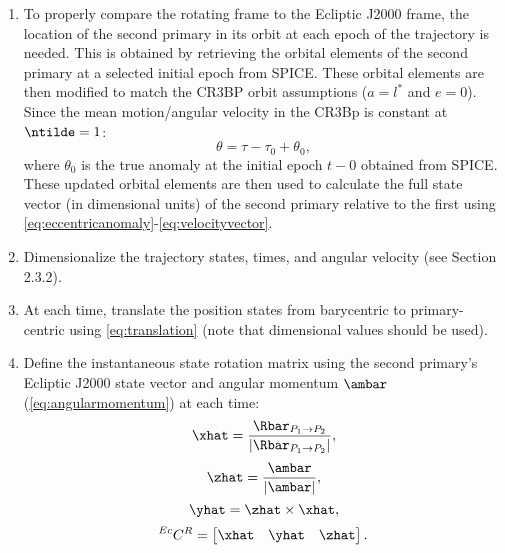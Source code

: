 \begin{enumerate}
    \item   To properly compare the rotating frame to the Ecliptic J2000 frame, the location of the
            second primary in its orbit at each epoch of the trajectory is needed. This is obtained
            by retrieving the orbital elements of the second primary at a selected initial epoch
            from SPICE\cite{Semenov:2023}. These orbital elements are then modified to match the
            CR3BP orbit assumptions ($a=l^{*}$ and $e=0$). Since the mean motion/angular velocity
            in the CR3Bp is constant at $\ntilde=1$:
            \begin{equation}
                \theta=\tau-\tau_{0}+\theta_{0},
                \label{eq:instantaneoustrueanomaly}
            \end{equation}
            where $\theta_{0}$ is the true anomaly at the initial epoch $t-{0}$ obtained from
            SPICE. These updated orbital elements are then used to calculate the full state vector
            (in dimensional units) of the second primary relative to the first using
            \cref{eq:eccentricanomaly}-\cref{eq:velocityvector}.
    \item   Dimensionalize the trajectory states, times, and angular velocity (see Section 2.3.2).
    \item   At each time, translate the position states from barycentric to primary-centric using
            \cref{eq:translation} (note that dimensional values should be used).
    \item   Define the instantaneous state rotation matrix using the second primary's Ecliptic
            J2000 state vector and angular momentum $\ambar$ (\cref{eq:angularmomentum}) at each
            time:
            \begin{equation}
                \xhat=\frac{\Rbar_{P_{1}\rightarrow P_{2}}}{|\Rbar_{P_{1}\rightarrow P_{2}}|},
                \label{eq:xhat}
            \end{equation}
            \begin{equation}
                \zhat=\frac{\ambar}{|\ambar|},
                \label{eq:zhat}
            \end{equation}
            \begin{equation}
                \yhat=\zhat\times\xhat,
                \label{eq:yhat}
            \end{equation}
            \begin{equation}
                \prescript{Ec}{}{C}^{R}=\begin{bmatrix} \xhat   &   \yhat   &   \zhat   \end{bmatrix}.
                \label{eq:eclipticpositionrotation}
            \end{equation}


\end{enumerate}
